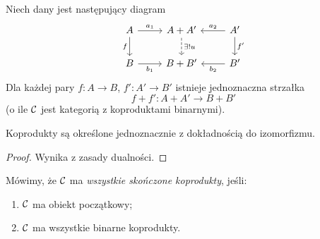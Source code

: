 Niech dany jest następujący diagram
\[
\begin{tikzcd}
A \arrow[r, "a_1"] \arrow[d, "f"'] & A + A' \arrow[d, dashed, "\exists! u"] & A' \arrow[l, "a_2"'] \arrow[d, "f'"] \\
B \arrow[r, "b_1"'] & B + B' & B' \arrow[l, "b_2"]
\end{tikzcd}
\]
Dla każdej pary $f \colon A \to B$, $f' \colon A' \to B'$ istnieje jednoznaczna strzałka
\[
f + f' \colon A + A' \to B + B'
\]
(o ile $\mathcal{C}$ jest kategorią z koproduktami binarnymi).

\begin{stwierdzenie}
Koprodukty są określone jednoznacznie z dokładnością do izomorfizmu.
\end{stwierdzenie}
\begin{proof}
Wynika z zasady dualności.
\end{proof}

\begin{definicja}
Mówimy, że $\mathcal{C}$ ma \emph{wszystkie skończone koprodukty}, jeśli:
\begin{enumerate}
\item $\mathcal{C}$ ma obiekt początkowy;
\item $\mathcal{C}$ ma wszystkie binarne koprodukty.
\end{enumerate}
\end{definicja}
